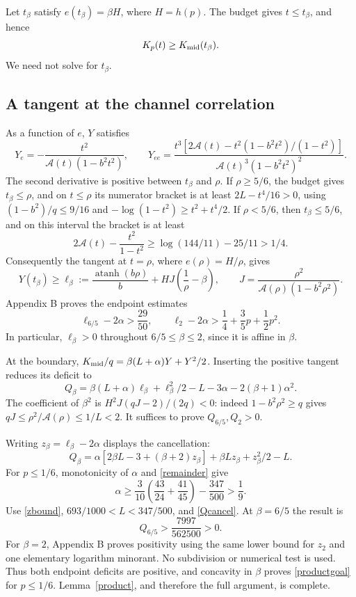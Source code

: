 \documentclass[11pt]{article}
\newcommand{\atanh}{\operatorname{atanh}}
\numberwithin{equation}{section}
\begin{document}
Let $t_\beta$ satisfy $e(t_\beta)=\beta H$, where $H=h(p)$. The budget gives $t\le t_\beta$, and hence
\begin{equation}\label{boundary}
 K_p(t)\ge K_{\rm mid}(t_\beta).
\end{equation}
We need not solve for $t_\beta$.

\subsection{A tangent at the channel correlation}
As a function of $e$, $Y$ satisfies
\[
 Y_e=-\frac{t^2}{\mathscr A(t)(1-b^2t^2)},\qquad
 Y_{ee}=\frac{t^3[2\mathscr A(t)-t^2(1-b^2t^2)/(1-t^2)]}
 {\mathscr A(t)^3(1-b^2t^2)^2}.
\]
The second derivative is positive between $t_\beta$ and $\rho$. If $\rho\ge5/6$, the budget gives $t_\beta\le\rho$, and on $t\le\rho$ its numerator bracket is at least $2L-t^4/16>0$, using $(1-b^2)/q\le9/16$ and $-\log(1-t^2)\ge t^2+t^4/2$. If $\rho<5/6$, then $t_\beta\le5/6$, and on this interval the bracket is at least
\[
 2\mathscr A(t)-\frac{t^2}{1-t^2}
 \ge\log(144/11)-25/11>1/4.
\]
Consequently the tangent at $t=\rho$, where $e(\rho)=H/\rho$, gives
\begin{equation}\label{canonicaltangent}
 Y(t_\beta)\ge\ell_\beta:=\frac{\atanh(b\rho)}b
 +HJ\left(\frac1\rho-\beta\right),\qquad
 J=\frac{\rho^2}{\mathscr A(\rho)(1-b^2\rho^2)}.
\end{equation}
Appendix B proves the endpoint estimates
\begin{equation}\label{zbound}
 \ell_{6/5}-2\alpha>\frac{29}{50},\qquad
 \ell_2-2\alpha>\frac14+\frac35p+\frac12p^2.
\end{equation}
In particular, $\ell_\beta>0$ throughout $6/5\le\beta\le2$, since it is affine in $\beta$.

At the boundary, $K_{\rm mid}/q=\beta(L+\alpha)Y+Y^2/2$. Inserting the positive tangent reduces its deficit to
\[
 Q_\beta=\beta(L+\alpha)\ell_\beta+\ell_\beta^2/2
          -L-3\alpha-2(\beta+1)\alpha^2.
\]
The coefficient of $\beta^2$ is $H^2J(qJ-2)/(2q)<0$: indeed $1-b^2\rho^2\ge q$ gives $qJ\le\rho^2/\mathscr A(\rho)\le1/L<2$. It suffices to prove $Q_{6/5},Q_2>0$.

Writing $z_\beta=\ell_\beta-2\alpha$ displays the cancellation:
\begin{equation}\label{Qcancel}
 Q_\beta=\alpha[2\beta L-3+(\beta+2)z_\beta]
          +\beta Lz_\beta+z_\beta^2/2-L.
\end{equation}
For $p\le1/6$, monotonicity of $\alpha$ and \eqref{remainder} give
\[
 \alpha\ge\frac3{10}\left(\frac{43}{24}+\frac{41}{45}\right)
 -\frac{347}{500}>\frac19.
\]
Use \eqref{zbound}, $693/1000<L<347/500$, and \eqref{Qcancel}. At $\beta=6/5$ the result is
\[
 Q_{6/5}>\frac{7997}{562500}>0.
\]
For $\beta=2$, Appendix B proves positivity using the same lower bound for $z_2$ and one elementary logarithm minorant. No subdivision or numerical test is used. Thus both endpoint deficits are positive, and concavity in $\beta$ proves \eqref{productgoal} for $p\le1/6$. Lemma~\ref{product}, and therefore the full argument, is complete.
\end{document}
